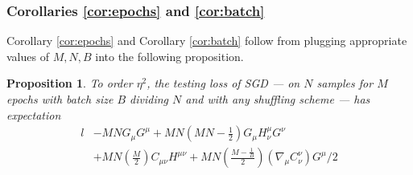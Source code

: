 \documentclass[final,12pt]{colt2021} %
\newtheorem{prop}{Proposition}
\newcommand{\wrap}[1]{\left(#1\right)}
\begin{document}
        \subsubsection{Corollaries \ref{cor:epochs} and \ref{cor:batch}}

            Corollary \ref{cor:epochs} and Corollary \ref{cor:batch} follow
            from plugging appropriate values of $M, N, B$ into the following
            proposition.

            \begin{prop}\label{prop:ordtwo}
                To order $\eta^2$, the testing loss of SGD --- on $N$
                samples for $M$ epochs with batch size $B$ dividing $N$ and with any
                shuffling scheme --- has expectation
                {\small
                \begin{align*}
                                                            l              
                    &- MN                                   G_\mu G^\mu       
                     + MN\wrap{MN - \frac{1}{2}}            G_\mu H^{\mu}_{\nu} G^\nu \\
                    &+ MN\wrap{\frac{M}{2}}                 C_{\mu \nu} H^{\mu \nu}
                     + MN\wrap{\frac{M-\frac{1}{B}}{2}}     \wrap{\nabla_\mu C^{\nu}_{\nu}} G^\mu / 2
                \end{align*}
                }
            \end{prop}
\end{document}
